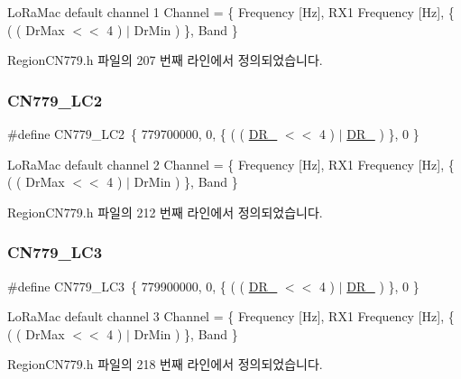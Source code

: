 Lo\+Ra\+Mac default channel 1 Channel = \{ Frequency \mbox{[}Hz\mbox{]}, R\+X1 Frequency \mbox{[}Hz\mbox{]}, \{ ( ( Dr\+Max $<$$<$ 4 ) $\vert$ Dr\+Min ) \}, Band \} 

Region\+C\+N779.\+h 파일의 207 번째 라인에서 정의되었습니다.

\mbox{\label{group___r_e_g_i_o_n_c_n779_ga758c5da7fe1372388ab9476835b4b4d2}} 
\subsubsection{\texorpdfstring{C\+N779\+\_\+\+L\+C2}{CN779\_LC2}}
{\footnotesize\ttfamily \#define C\+N779\+\_\+\+L\+C2~\{ 779700000, 0, \{ ( ( \mbox{\hyperlink{group___r_e_g_i_o_n_ga872e12c82020c02a7f70a1c6ed1375df}{D\+R\+\_}} $<$$<$ 4 ) $\vert$ \mbox{\hyperlink{group___r_e_g_i_o_n_ga6c4ef966b4f3d5eb7597b087f2b97095}{D\+R\+\_}} ) \}, 0 \}}

Lo\+Ra\+Mac default channel 2 Channel = \{ Frequency \mbox{[}Hz\mbox{]}, R\+X1 Frequency \mbox{[}Hz\mbox{]}, \{ ( ( Dr\+Max $<$$<$ 4 ) $\vert$ Dr\+Min ) \}, Band \} 

Region\+C\+N779.\+h 파일의 212 번째 라인에서 정의되었습니다.

\mbox{\label{group___r_e_g_i_o_n_c_n779_ga8e9d424722db59d84a7d122e95f3cce7}} 
\subsubsection{\texorpdfstring{C\+N779\+\_\+\+L\+C3}{CN779\_LC3}}
{\footnotesize\ttfamily \#define C\+N779\+\_\+\+L\+C3~\{ 779900000, 0, \{ ( ( \mbox{\hyperlink{group___r_e_g_i_o_n_ga872e12c82020c02a7f70a1c6ed1375df}{D\+R\+\_}} $<$$<$ 4 ) $\vert$ \mbox{\hyperlink{group___r_e_g_i_o_n_ga6c4ef966b4f3d5eb7597b087f2b97095}{D\+R\+\_}} ) \}, 0 \}}

Lo\+Ra\+Mac default channel 3 Channel = \{ Frequency \mbox{[}Hz\mbox{]}, R\+X1 Frequency \mbox{[}Hz\mbox{]}, \{ ( ( Dr\+Max $<$$<$ 4 ) $\vert$ Dr\+Min ) \}, Band \} 

Region\+C\+N779.\+h 파일의 218 번째 라인에서 정의되었습니다.

